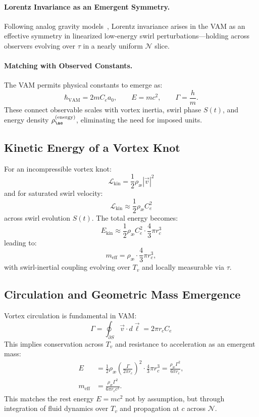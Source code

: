 \paragraph{Lorentz Invariance as an Emergent Symmetry.}
Following analog gravity models~\cite{barcelo2011}, Lorentz invariance arises in the VAM as an effective symmetry in linearized low-energy swirl perturbations—holding across observers evolving over $\tau$ in a nearly uniform $\mathcal{N}$ slice.

\paragraph{Matching with Observed Constants.}
The VAM permits physical constants to emerge as:
\[
    \hbar_{\text{VAM}} = 2 m C_e a_0, \qquad E = m c^2, \qquad \Gamma = \frac{h}{m}.
\]
These connect observable scales with vortex inertia, swirl phase $S(t)$, and energy density $\rho_{\ae}^{(\text{energy})}$, eliminating the need for imposed units.

\subsection{Kinetic Energy of a Vortex Knot}

For an incompressible vortex knot:
\begin{equation}
    \mathcal{L}_\text{kin} = \frac{1}{2} \rho_\text{\ae} |\vec{v}|^2
\end{equation}
and for saturated swirl velocity:
\[
    \mathcal{L}_\text{kin} \approx \frac{1}{2} \rho_\text{\ae} C_e^2
\]
across swirl evolution $S(t)$. The total energy becomes:
\[
    E_\text{kin} \approx \frac{1}{2} \rho_\text{\ae} C_e^2 \cdot \frac{4}{3} \pi r_c^3
\]
leading to:
\[
    m_\text{eff} = \rho_\text{\ae} \cdot \frac{4}{3} \pi r_c^3,
\]
with swirl-inertial coupling evolving over $T_v$ and locally measurable via $\tau$.

\subsection{Circulation and Geometric Mass Emergence}

Vortex circulation is fundamental in VAM:
\[
    \Gamma = \oint_{\partial S} \vec{v} \cdot d\vec{\ell} = 2\pi r_c C_e
\]
This implies conservation across $T_v$ and resistance to acceleration as an emergent mass:
\begin{align}
    E &= \frac{1}{2} \rho_\text{\ae} \left( \frac{\Gamma}{2\pi r_c} \right)^2 \cdot \frac{4}{3} \pi r_c^3
    = \frac{\rho_\text{\ae} \Gamma^2}{6\pi r_c}, \\
    m_\text{eff} &= \frac{\rho_\text{\ae} \Gamma^2}{6\pi r_c c^2}.
\end{align}
This matches the rest energy \( E = m c^2 \) not by assumption, but through integration of fluid dynamics over $T_v$ and propagation at $c$ across $\mathcal{N}$.

